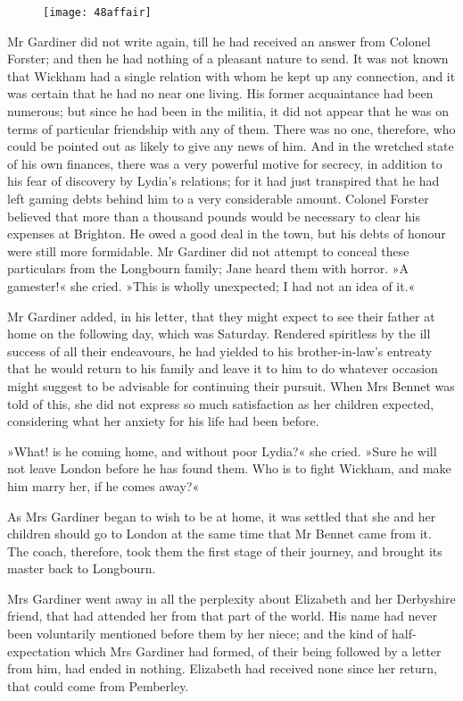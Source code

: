\begin{figure}[tbh]
\centering
\texttt{[image: 48affair]}
\end{figure}

Mr Gardiner did not write again, till he had received an answer from Colonel Forster; and then he had nothing of a pleasant nature to send. It was not known that Wickham had a single relation with whom he kept up any connection, and it was certain that he had no near one living. His former acquaintance had been numerous; but since he had been in the militia, it did not appear that he was on terms of particular friendship with any of them. There was no one, therefore, who could be pointed out as likely to give any news of him. And in the wretched state of his own finances, there was a very powerful motive for secrecy, in addition to his fear of discovery by Lydia's relations; for it had just transpired that he had left gaming debts behind him to a very considerable amount. Colonel Forster believed that more than a thousand pounds would be necessary to clear his expenses at Brighton. He owed a good deal in the town, but his debts of honour were still more formidable. Mr Gardiner did not attempt to conceal these particulars from the Longbourn family; Jane heard them with horror. »A gamester!« she cried. »This is wholly unexpected; I had not an idea of it.«

Mr Gardiner added, in his letter, that they might expect to see their father at home on the following day, which was Saturday. Rendered spiritless by the ill success of all their endeavours, he had yielded to his brother-in-law's entreaty that he would return to his family and leave it to him to do whatever occasion might suggest to be advisable for continuing their pursuit. When Mrs Bennet was told of this, she did not express so much satisfaction as her children expected, considering what her anxiety for his life had been before.

»What! is he coming home, and without poor Lydia?« she cried. »Sure he will not leave London before he has found them. Who is to fight Wickham, and make him marry her, if he comes away?«

As Mrs Gardiner began to wish to be at home, it was settled that she and her children should go to London at the same time that Mr Bennet came from it. The coach, therefore, took them the first stage of their journey, and brought its master back to Longbourn.

Mrs Gardiner went away in all the perplexity about Elizabeth and her Derbyshire friend, that had attended her from that part of the world. His name had never been voluntarily mentioned before them by her niece; and the kind of half-expectation which Mrs Gardiner had formed, of their being followed by a letter from him, had ended in nothing. Elizabeth had received none since her return, that could come from Pemberley.

